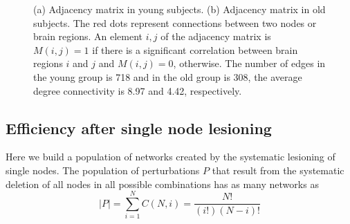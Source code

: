 \documentclass[12pt,a4paper]{article}
\begin{document}
\begin{figure}[H]
    \hfill
    \caption{\small (a) Adjacency matrix in young subjects.   
  \small (b) Adjacency matrix in old subjects. The red dots represent connections between two nodes or brain regions. An element $i,j$ of the adjacency matrix is $M(i,j) =1$ if there is a significant correlation between brain regions $i$ and $j$ and $M(i,j) =0$, otherwise.  The number of edges in the young group is 718 and in the old group is 308, the average degree connectivity is 8.97 and 4.42, respectively.}
    \label{fig:adjmat}
  \end{figure} 
 
\subsection{Efficiency after single node lesioning}
\label{ss:single}
Here we build a population of networks created by the systematic lesioning of single nodes. 
The population of perturbations $P$ that result from the systematic deletion of all nodes in all possible combinations has as many networks as  
\begin{equation*}
|P| = \sum_{i=1}^{N} C(N,i) = \frac{N!} {(i!)(N-i)!}
\label{eq:perurb}
\end{equation*}
\end{document}
